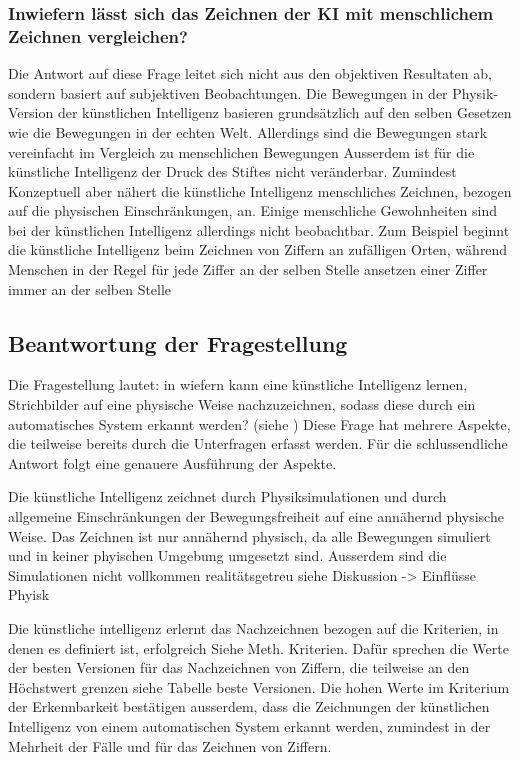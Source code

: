 {%

\subsubsection*{Inwiefern lässt sich das Zeichnen der KI mit menschlichem Zeichnen vergleichen?}
\label{subsub:d_frage_unter_6}
Die Antwort auf diese Frage leitet sich nicht aus den objektiven Resultaten ab,
sondern basiert auf subjektiven Beobachtungen. Die Bewegungen in der
Physik-Version der künstlichen Intelligenz basieren grundsätzlich auf den selben
Gesetzen wie die Bewegungen in der echten Welt. Allerdings sind die Bewegungen
stark vereinfacht im Vergleich zu menschlichen Bewegungen Ausserdem ist für die
künstliche Intelligenz der Druck des Stiftes nicht veränderbar. Zumindest
Konzeptuell aber nähert die künstliche Intelligenz menschliches Zeichnen,
bezogen auf die physischen Einschränkungen, an. Einige menschliche Gewohnheiten
sind bei der künstlichen Intelligenz allerdings nicht beobachtbar. Zum Beispiel
beginnt die künstliche Intelligenz beim Zeichnen von Ziffern an zufälligen
Orten, während Menschen in der Regel für jede Ziffer an der selben Stelle
ansetzen einer Ziffer immer an der selben Stelle


\subsection{Beantwortung der Fragestellung}
\label{sub:d_frage_frag}
Die Fragestellung lautet: in wiefern kann eine künstliche Intelligenz lernen,
Strichbilder auf eine physische Weise nachzuzeichnen, sodass diese durch ein
automatisches System erkannt werden? (siehe ) Diese Frage
hat mehrere Aspekte, die teilweise bereits durch die Unterfragen erfasst werden.
Für die schlussendliche Antwort folgt eine genauere Ausführung der Aspekte.

Die künstliche Intelligenz zeichnet durch Physiksimulationen und durch
allgemeine Einschränkungen der Bewegungsfreiheit auf eine annähernd physische
Weise. Das Zeichnen ist nur annähernd physisch, da alle Bewegungen simuliert und
in keiner phyischen Umgebung umgesetzt sind. Ausserdem sind die Simulationen
nicht vollkommen realitätsgetreu {siehe Diskussion -> Einflüsse Phyisk }

Die künstliche intelligenz erlernt das Nachzeichnen bezogen auf die Kriterien,
in denen es definiert ist, erfolgreich {Siehe Meth. Kriterien}. Dafür sprechen
die Werte der besten Versionen für das Nachzeichnen von Ziffern, die teilweise
an den Höchstwert grenzen {siehe Tabelle beste Versionen}. Die hohen Werte im
Kriterium der Erkennbarkeit bestätigen ausserdem, dass die Zeichnungen der
künstlichen Intelligenz von einem automatischen System erkannt werden, zumindest
in der Mehrheit der Fälle und für das Zeichnen von Ziffern.


}
